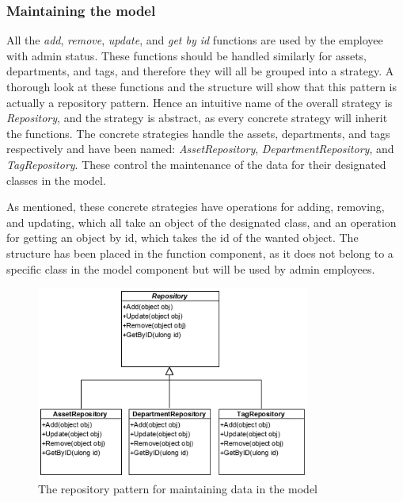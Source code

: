 \subsubsection{Maintaining the model}
All the \textit{add}, \textit{remove}, \textit{update}, and \textit{get by id} functions are used by the employee with admin status. These functions should be handled similarly for assets, departments, and tags, and therefore they will all be grouped into a strategy. A thorough look at these functions and the structure will show that this pattern is actually a repository pattern. Hence an intuitive name of the overall strategy is \textit{Repository}, and the strategy is abstract, as every concrete strategy will inherit the functions. The concrete strategies handle the assets, departments, and tags respectively and have been named: \textit{AssetRepository}, \textit{DepartmentRepository}, and \textit{TagRepository}. These control the maintenance of the data for their designated classes in the model.
\par
As mentioned, these concrete strategies have operations for adding, removing, and updating, which all take an object of the designated class, and an operation for getting an object by id, which takes the id of the wanted object. The structure has been placed in the function component, as it does not belong to a specific class in the model component but will be used by admin employees.
\begin{figure}[H]
    \centering
    \includegraphics[width=0.8\textwidth]{figures/FunctionComponent/Repository_pattern.png}
    \caption{The repository pattern for maintaining data in the model}
    \label{fig:RepositoryPattern}
\end{figure}

